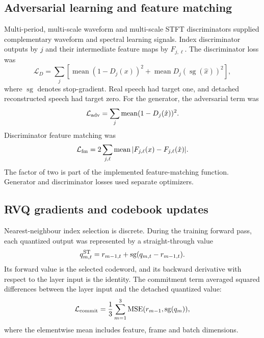 \subsection{Adversarial learning and feature matching}
Multi-period, multi-scale waveform and multi-scale STFT discriminators supplied complementary waveform and spectral learning signals. Index discriminator outputs by $j$ and their intermediate feature maps by $F_{j,\ell}$. The discriminator loss was
\begin{equation}
 \mathcal L_D=\sum_j\left[
  \operatorname{mean}(1-D_j(x))^2
  +\operatorname{mean}D_j(\operatorname{sg}(\hat x))^2
 \right],
 \label{eq:sv2-disc}
\end{equation}
where $\operatorname{sg}$ denotes stop-gradient. Real speech had target one, and detached reconstructed speech had target zero. For the generator, the adversarial term was
\begin{equation}
 \mathcal L_{\rm adv}
 =\sum_j\operatorname{mean}(1-D_j(\hat x))^2.
 \label{eq:sv2-adv}
\end{equation}
Discriminator feature matching was
\begin{equation}
 \mathcal L_{\rm fm}
 =2\sum_{j,\ell}\operatorname{mean}
   |F_{j,\ell}(x)-F_{j,\ell}(\hat x)|.
 \label{eq:sv2-fm}
\end{equation}
The factor of two is part of the implemented feature-matching function. Generator and discriminator losses used separate optimizers.

\subsection{RVQ gradients and codebook updates}
Nearest-neighbour index selection is discrete. During the training forward pass, each quantized output was represented by a straight-through value
\begin{equation}
 q^{\rm ST}_{m,t}
 =r_{m-1,t}+\operatorname{sg}(q_{m,t}-r_{m-1,t}).
 \label{eq:sv2-ste}
\end{equation}
Its forward value is the selected codeword, and its backward derivative with respect to the layer input is the identity. The commitment term averaged squared differences between the layer input and the detached quantized value:
\begin{equation}
 \mathcal L_{\rm commit}
 =\frac{1}{3}\sum_{m=1}^{3}
   \operatorname{MSE}(r_{m-1},\operatorname{sg}(q_m)),
 \label{eq:sv2-commit}
\end{equation}
where the elementwise mean includes feature, frame and batch dimensions.

